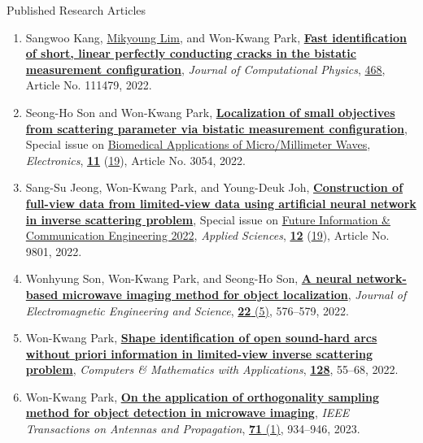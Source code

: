 \documentclass{resume} %
\begin{document}
\begin{rSection}{Published Research Articles}
\begin{enumerate}
\item\label{A-JCOMP2022B} Sangwoo Kang, \href{https://www.mikyounglim.net}{Mikyoung Lim}, and Won-Kwang Park, \href{https://doi.org/10.1016/j.jcp.2022.111479}{\textbf{Fast identification of short, linear perfectly conducting cracks in the bistatic measurement configuration}}, \textit{Journal of Computational Physics}, \href{https://www.sciencedirect.com/journal/journal-of-computational-physics/vol/468/suppl/C}{468}, Article No. 111479, 2022.
\item\label{A-ELECTRONICS2022} Seong-Ho Son and Won-Kwang Park, \href{https://doi.org/10.3390/electronics11193054}{\textbf{Localization of small objectives from scattering parameter via bistatic measurement configuration}}, Special issue on \href{https://www.mdpi.com/journal/electronics/special_issues/biomedical_MMW}{Biomedical Applications of Micro/Millimeter Waves}, \textit{Electronics}, \href{https://www.mdpi.com/2079-9292/11}{\textbf{11}} (\href{https://www.mdpi.com/2079-9292/11/19}{19}), Article No. 3054, 2022.
\item\label{A-APPLSCI2022} Sang-Su Jeong, Won-Kwang Park, and Young-Deuk Joh, \href{https://doi.org/10.3390/app12199801}{\textbf{Construction of full-view data from limited-view data using artificial neural network in inverse scattering problem}}, Special issue on \href{https://www.mdpi.com/journal/applsci/special_issues/ICFICE2022}{Future Information \& Communication Engineering 2022}, \textit{Applied Sciences}, \href{https://www.mdpi.com/2076-3417/12}{\textbf{12}} (\href{https://www.mdpi.com/2076-3417/12/19}{19}), Article No. 9801, 2022.
\item\label{A-JEES2022} Wonhyung Son, Won-Kwang Park, and Seong-Ho Son, \href{https://doi.org/10.26866/jees.2022.5.r.125}{\textbf{A neural network-based microwave imaging method for object localization}}, \textit{Journal of Electromagnetic Engineering and Science}, \href{http://jees.kr/current/index.php?vol=22&no=5}{\textbf{22} (5)}, 576--579, 2022.
\item\label{A-CAMWA2022C} Won-Kwang Park, \href{https://doi.org/10.1016/j.camwa.2022.10.010}{\textbf{Shape identification of open sound-hard arcs without priori information in limited-view inverse scattering problem}}, \textit{Computers \& Mathematics with Applications}, \href{https://www.sciencedirect.com/journal/computers-and-mathematics-with-applications/vol/128/suppl/C}{\textbf{128}}, 55--68, 2022.
\item\label{A-IEEETAP2023} Won-Kwang Park, \href{https://doi.org/10.1109/TAP.2022.3220033}{\textbf{On the application of orthogonality sampling method for object detection in microwave imaging}}, \textit{IEEE Transactions on Antennas and Propagation}, \href{https://ieeexplore.ieee.org/xpl/tocresult.jsp?isnumber=10021137&punumber=8}{\textbf{71} (1)}, 934--946, 2023.

\end{enumerate}
\end{rSection}
\end{document}
